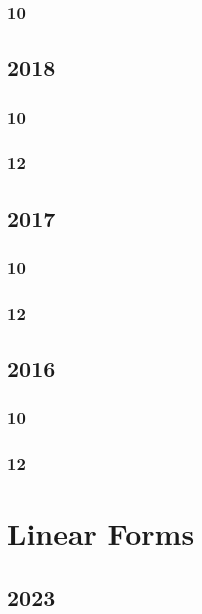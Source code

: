 \documentclass[11pt]{book}
\begin{document}
\subsection{10}

\section{2018}
\subsection{10}

\subsection{12}




\section{2017}
\subsection{10}

\subsection{12}








\section{2016}
\subsection{10}

\subsection{12}







\chapter{Linear Forms}
\section{2023}
\end{document}
